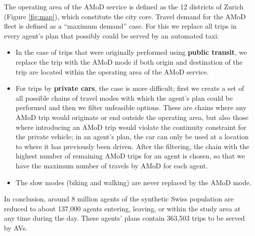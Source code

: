 The operating area of the AMoD service is defined as the 12 districts of Zurich (Figure \ref{fig:map}), which constitute the city core. Travel demand for the AMoD fleet is defined as a ``maximum demand'' case. For this we replace all trips in every agent’s plan that possibly could be served by an automated taxi:


\begin{itemize}
\item In the case of trips that were originally  performed using \textbf{public transit}, we replace the trip with the AMoD mode if both origin and destination of the trip are located within the operating area of the AMoD service.
\item For trips by \textbf{private cars}, the case is more difficult; first we create a set of all possible chains of travel modes with which the agent's plan could be performed and then we filter unfeasible options. These are chains where any AMoD trip would originate or end outside the operating area, but also those where introducing an AMoD trip would violate the continuity constraint for the private vehicle; in an agent’s plan, the car can only be used at a location to where it has previously been driven. After the filtering, the chain with the highest number of remaining AMoD trips for an agent is chosen, so that we have the maximum number of travels by AMoD for each agent.
\item The slow modes (biking and walking) are never replaced by the AMoD mode.
\end{itemize}

In conclusion, around 8 million agents of the synthetic Swiss population are reduced to about 137,000 agents entering, leaving, or within the study area at any time during the day. These agents’ plans contain 363,503 trips to be served by AVs.
